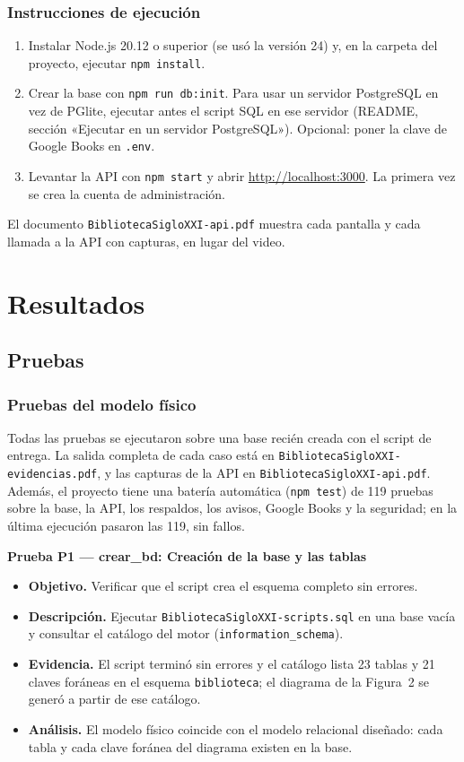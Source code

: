 \documentclass[11pt,a4paper]{article}
\begin{document}
\subsubsection{Instrucciones de ejecución}
\begin{enumerate}[nosep]
\item Instalar Node.js 20.12 o superior (se usó la versión 24) y, en la carpeta del proyecto, ejecutar \texttt{npm install}.
\item Crear la base con \texttt{npm run db:init}. Para usar un servidor PostgreSQL en vez de PGlite, ejecutar antes el script SQL en ese servidor (README, sección «Ejecutar en un servidor PostgreSQL»). Opcional: poner la clave de Google Books en \texttt{.env}.
\item Levantar la API con \texttt{npm start} y abrir \url{http://localhost:3000}. La primera vez se crea la cuenta de administración.
\end{enumerate}
El documento \texttt{BibliotecaSigloXXI-api.pdf} muestra cada pantalla y cada llamada a la API con capturas, en lugar del video.

\section{Resultados}

\subsection{Pruebas}

\subsubsection{Pruebas del modelo físico}

Todas las pruebas se ejecutaron sobre una base recién creada con el script de entrega. La salida completa de cada caso está en \texttt{BibliotecaSigloXXI-evidencias.pdf}, y las capturas de la API en \texttt{BibliotecaSigloXXI-api.pdf}. Además, el proyecto tiene una batería automática (\texttt{npm test}) de 119 pruebas sobre la base, la API, los respaldos, los avisos, Google Books y la seguridad; en la última ejecución pasaron las 119, sin fallos.

\textbf{Prueba P1 --- crear\_bd: Creación de la base y las tablas}
\begin{itemize}[nosep]
\item \textbf{Objetivo.} Verificar que el script crea el esquema completo sin errores.
\item \textbf{Descripción.} Ejecutar \texttt{BibliotecaSigloXXI-scripts.sql} en una base vacía y consultar el catálogo del motor (\texttt{information\_schema}).
\item \textbf{Evidencia.} El script terminó sin errores y el catálogo lista 23 tablas y 21 claves foráneas en el esquema \texttt{biblioteca}; el diagrama de la Figura~2 se generó a partir de ese catálogo.
\item \textbf{Análisis.} El modelo físico coincide con el modelo relacional diseñado: cada tabla y cada clave foránea del diagrama existen en la base.
\end{itemize}
\end{document}
